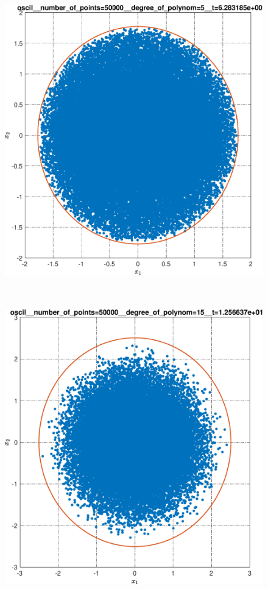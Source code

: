 \documentclass[../main.tex]{subfiles}
\begin{document}
\begin{figure}[ht!]
\begin{minipage}[b]{.3\linewidth}
  		\includegraphics[width=\linewidth]{images/oscil__number_of_points=50000__degree_of_polynom=5__t=2pi.eps}
  		\label{fig:ap:oscilN5104k5T2pi}
  	\end{minipage} 
  	\hfill
  	\begin{minipage}[b]{.3\linewidth} 
  		\small
  		\centering
  		\includegraphics[width=\linewidth]{images/oscil__number_of_points=50000__degree_of_polynom=15__t=4pi.eps}

\end{minipage}
\end{figure}
\end{document}
